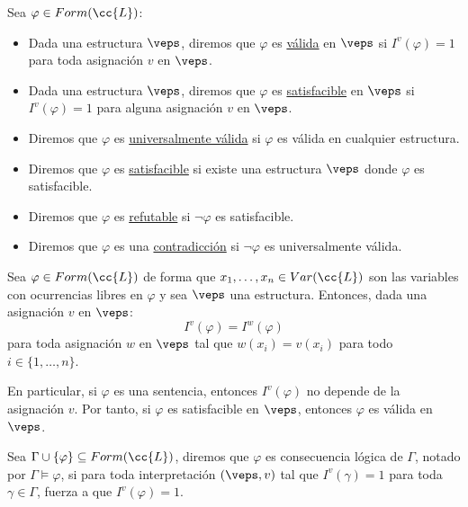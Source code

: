 \begin{definicion}
    Sea $\varphi\in Form(\cc{L})$:
    \begin{itemize}
        \item Dada una estructura $\veps$, diremos que $\varphi$ es \underline{válida} en $\veps$ si $I^v(\varphi)=1$ para toda asignación $v$ en $\veps$.
        \item Dada una estructura $\veps$, diremos que $\varphi$ es \underline{satisfacible} en $\veps$ si $I^v(\varphi)=1$ para alguna asignación $v$ en $\veps$.
        \item Diremos que $\varphi$ es \underline{universalmente válida} si $\varphi$ es válida en cualquier estructura.
        \item Diremos que $\varphi$ es \underline{satisfacible} si existe una estructura $\veps$ donde $\varphi$ es satisfacible.
        \item Diremos que $\varphi$ es \underline{refutable} si $\lnot\varphi$ es satisfacible.
        \item Diremos que $\varphi$ es una \underline{contradicción} si $\lnot\varphi$ es universalmente válida.
    \end{itemize}
\end{definicion}

\begin{lema}[de Coincidencia]\label{lema:coincidencia}
    Sea $\varphi\in Form(\cc{L})$ de forma que $x_1,\ldots,x_n\in Var(\cc{L})$ son las variables con ocurrencias libres en $\varphi$ y sea $\veps$ una estructura. Entonces, dada una asignación $v$ en $\veps$:
    \begin{equation*}
        I^v(\varphi) = I^{w}(\varphi)
    \end{equation*}
    para toda asignación $w$ en $\veps$ tal que $w(x_i)=v(x_i)$ para todo $i \in \{1,\ldots,n\}$.
\end{lema}

\begin{observacion}
    En particular, si $\varphi$ es una sentencia, entonces $I^v(\varphi)$ no depende de la asignación $v$. Por tanto, si $\varphi$ es satisfacible en $\veps$, entonces $\varphi$ es válida en $\veps$.
\end{observacion}

\begin{definicion}
    Sea $\Gamma \cup \{\varphi\}\subseteq Form(\cc{L})$, diremos que $\varphi$ es consecuencia lógica de $\Gamma$, notado por $\Gamma\vDash \varphi$, si para toda interpretación $(\veps,v)$ tal que $I^v(\gamma)=1$ para toda $\gamma\in\Gamma$, fuerza a que $I^v(\varphi)=1$.
\end{definicion}

